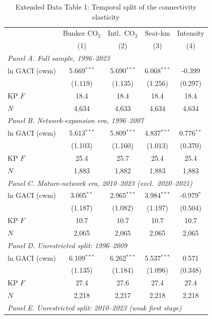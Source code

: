 \begin{table}[htbp]
\centering
\begin{threeparttable}
\caption{Extended Data Table 1: Temporal split of the connectivity elasticity}
\label{tab:temporal}
\footnotesize
\begin{tabular}{lcccc}
\toprule
 & \multicolumn{1}{c}{Bunker CO$_2$} & \multicolumn{1}{c}{Intl.\ CO$_2$} & \multicolumn{1}{c}{Seat-km} & \multicolumn{1}{c}{Intensity} \\
 & (1) & (2) & (3) & (4) \\
\midrule
\multicolumn{5}{l}{\textit{Panel A. Full sample, 1996--2023}} \\
  ln GACI (cwm) & 5.669$^{***}$ & 5.690$^{***}$ & 6.068$^{***}$ & -0.399 \\
   & (1.119) & (1.135) & (1.256) & (0.297) \\
  KP $F$ & 18.4 & 18.4 & 18.4 & 18.4 \\
  $N$ & 4,634 & 4,633 & 4,634 & 4,634 \\
\midrule
\multicolumn{5}{l}{\textit{Panel B. Network-expansion era, 1996--2007}} \\
  ln GACI (cwm) & 5.613$^{***}$ & 5.809$^{***}$ & 4.837$^{***}$ & 0.776$^{**}$ \\
   & (1.103) & (1.160) & (1.013) & (0.370) \\
  KP $F$ & 25.4 & 25.7 & 25.4 & 25.4 \\
  $N$ & 1,883 & 1,882 & 1,883 & 1,883 \\
\midrule
\multicolumn{5}{l}{\textit{Panel C. Mature-network era, 2010--2023 (excl.\ 2020--2021)}} \\
  ln GACI (cwm) & 3.005$^{**}$ & 2.965$^{***}$ & 3.984$^{***}$ & -0.979$^{*}$ \\
   & (1.187) & (1.082) & (1.197) & (0.504) \\
  KP $F$ & 10.7 & 10.7 & 10.7 & 10.7 \\
  $N$ & 2,065 & 2,065 & 2,065 & 2,065 \\
\midrule
\multicolumn{5}{l}{\textit{Panel D. Unrestricted split: 1996--2009}} \\
  ln GACI (cwm) & 6.109$^{***}$ & 6.262$^{***}$ & 5.537$^{***}$ & 0.571 \\
   & (1.135) & (1.184) & (1.096) & (0.348) \\
  KP $F$ & 27.4 & 27.6 & 27.4 & 27.4 \\
  $N$ & 2,218 & 2,217 & 2,218 & 2,218 \\
\midrule
\multicolumn{5}{l}{\textit{Panel E. Unrestricted split: 2010--2023 (weak first stage)}} \\

\end{tabular}
\end{threeparttable}
\end{table}
